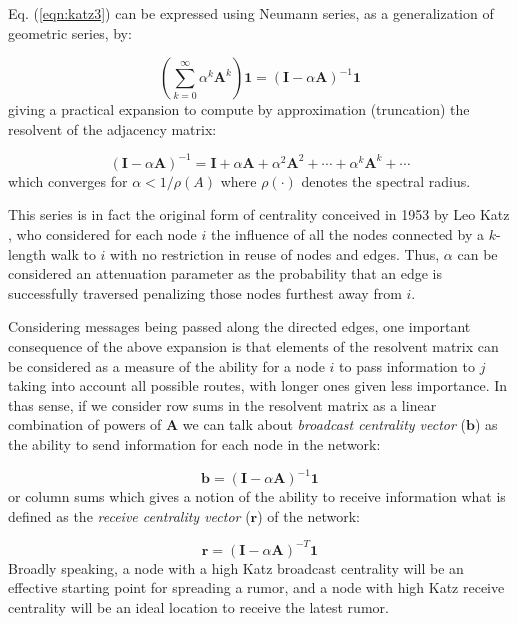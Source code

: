 Eq. (\ref{eqn:katz3}) can be expressed using Neumann series, as a generalization of geometric series, by: 

\begin{equation}
\label{eqn:katz4}
    \left(\sum_{k=0}^{\infty}\alpha^k \mathbf{A}^k\right)\mathbf{1} = (\mathbf{I}-\alpha\mathbf{A})^{-1}\mathbf{1}
\end{equation}
giving a practical expansion to compute by approximation (truncation) the resolvent of the adjacency matrix:

\begin{equation}
\label{eqn:katz5}
    (\mathbf{I}-\alpha\mathbf{A})^{-1} = \mathbf{I} + \alpha\mathbf{A} + \alpha^2\mathbf{A}^2 + \cdots + \alpha^k\mathbf{A}^k + \cdots
\end{equation}
which converges for $\alpha<1/\rho(A)$ where $\rho(\cdot)$ denotes the spectral radius. 

This series is in fact the original form of centrality conceived in 1953 by Leo Katz  \cite{katz1953new}, who considered for each node $i$ the influence of all the nodes connected by a $k$-length walk to $i$ with no restriction in reuse of nodes and edges. Thus, $\alpha$ can be considered an attenuation parameter as the probability that an edge is successfully traversed penalizing those nodes furthest away from $i$. 

Considering messages being passed along the directed edges, one important consequence of the above expansion is that elements of the resolvent matrix can be considered as a measure of the ability for a node $i$ to pass information to $j$ taking into account all possible routes, with longer ones given less importance. In thas sense, if we consider row sums in the resolvent matrix as a linear combination of powers of $\mathbf{A}$ we can talk about \textit{broadcast centrality vector} ($\mathbf{b}$) as the ability to send information for each node in the network:  

\begin{equation}
\label{eqn:broad}
    \mathbf{b}=(\mathbf{I}-\alpha\mathbf{A})^{-1} \mathbf{1}
\end{equation}
or column sums which gives a notion of the ability to receive information what is defined as the \textit{receive centrality vector} ($\mathbf{r}$) of the network:

\begin{equation}
\label{eqn:receiv}
    \mathbf{r} = (\mathbf{I}-\alpha\mathbf{A})^{-T} \mathbf{1}
\end{equation}
Broadly speaking, a node with a high Katz broadcast centrality will be an effective starting point for spreading a rumor, and a node with high Katz receive centrality will be an ideal location to receive the latest rumor.

